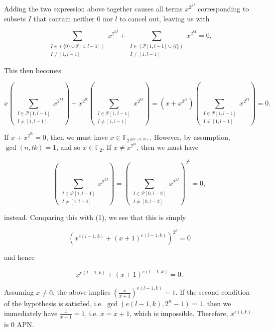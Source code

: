 \documentclass[10pt]{article}
\begin{document}
Adding the two expression above together causes all terms $x^{2^{k I}}$ corresponding to subsets $I$ that contain neither 0 nor $l$ to cancel out, leaving us with

$$
\sum_{\substack{I \in(\{0\} \cup \mathcal{P}[1, l-1]) \\ I \neq[1, l-1]}} x^{2^{k I}}+\sum_{\substack{I \in(\mathcal{P}[1, l-1] \cup\{l\}) \\ I \neq[1, l-1]}} x^{2^{k I}}=0 .
$$

This then becomes

$$
x\left(\sum_{\substack{I \in \mathcal{P}[1, l-1] \\ I \neq[1, l-1]}} x^{2^{k I}}\right)+x^{2^{l k}}\left(\sum_{\substack{I \in \mathcal{P}[1, l-1] \\ I \neq[1, l-1]}} x^{2^{k I}}\right)=\left(x+x^{2^{l k}}\right)\left(\sum_{\substack{I \in \mathcal{P}[1, l-1] \\ I \neq[1, l-1]}} x^{2^{k I}}\right)=0 .
$$

If $x+x^{2^{l k}}=0$, then we must have $x \in \mathbb{F}_{2^{\operatorname{gcd}(n, l k)}}$. However, by assumption, $\operatorname{gcd}(n, l k)=1$, and so $x \in \mathbb{F}_{2}$. If $x \neq x^{2^{l k}}$, then we must have

$$
\left(\sum_{\substack{I \in \mathcal{P}[1, l-1] \\ I \neq[1, l-1]}} x^{2^{k I}}\right)=\left(\sum_{\substack{I \in \mathcal{P}[0, l-2] \\ I \neq[0, l-2]}} x^{2^{k I}}\right)^{2^{k}}=0,
$$

instead. Comparing this with (1), we see that this is simply

$$
\left(x^{e(l-1, k)}+(x+1)^{e(l-1, k)}\right)^{2^{k}}=0
$$

and hence


\begin{equation*}
x^{e(l-1, k)}+(x+1)^{e(l-1, k)}=0 . \tag{2}
\end{equation*}


Assuming $x \neq 0$, the above implies $\left(\frac{x}{x+1}\right)^{e(l-1, k)}=1$. If the second condition of the hypothesis is satisfied, i.e. $\operatorname{gcd}\left(e(l-1, k), 2^{n}-1\right)=1$, then we immediately have $\frac{x}{x+1}=1$, i.e. $x=x+1$, which is impossible. Therefore, $x^{e(l, k)}$ is 0 APN.
\end{document}
